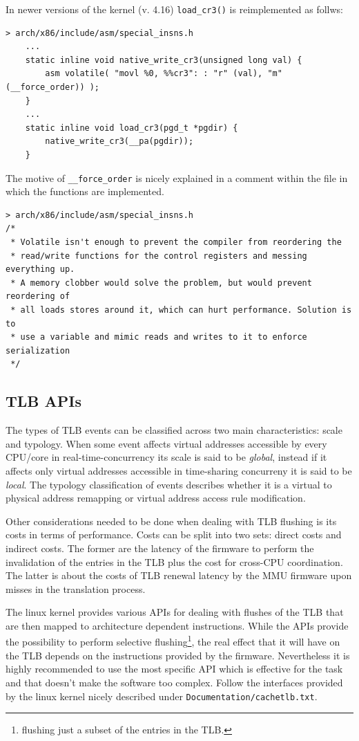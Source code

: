 \documentclass[twoside]{article}
\begin{document}
In newer versions of the kernel (v. 4.16) \texttt{load_cr3()} is
reimplemented as follws:

\begin{verbatim}
> arch/x86/include/asm/special_insns.h 
    ...
    static inline void native_write_cr3(unsigned long val) {
        asm volatile( "movl %0, %%cr3": : "r" (val), "m" (__force_order)) );
    }
    ...
    static inline void load_cr3(pgd_t *pgdir) {
        native_write_cr3(__pa(pgdir));
    }   
\end{verbatim}

The motive of \texttt{__force_order} is nicely explained in a comment within
the file in which the functions are implemented.

\begin{verbatim}
> arch/x86/include/asm/special_insns.h 
/*
 * Volatile isn't enough to prevent the compiler from reordering the
 * read/write functions for the control registers and messing everything up.
 * A memory clobber would solve the problem, but would prevent reordering of
 * all loads stores around it, which can hurt performance. Solution is to
 * use a variable and mimic reads and writes to it to enforce serialization
 */
\end{verbatim}

\subsection{TLB APIs}
\label{subsec:TLB APIs}

The types of TLB events can be classified across two main characteristics:
scale and typology. When some event affects virtual addresses accessible
by every CPU/core in real-time-concurrency its scale is said to be
\textit{global}, instead if it affects only virtual addresses accessible
in time-sharing concurreny it is said to be \textit{local}.
The typology classification of events describes whether it is a virtual
to physical address remapping or virtual address access rule modification.

Other considerations needed to be done when dealing with TLB flushing is
its costs in terms of performance. Costs can be split into two sets: direct
costs and indirect costs. The former are the latency of the firmware to
perform the invalidation of the entries in the TLB plus the cost for
cross-CPU coordination. The latter is about the costs of TLB renewal
latency by the MMU firmware upon misses in the translation process.

The linux kernel provides various APIs for dealing with flushes of the
TLB that are then mapped to architecture dependent instructions. While
the APIs provide the possibility to perform selective flushing\footnote{
flushing just a subset of the entries in the TLB.}, the real effect
that it will have on the TLB depends on the instructions provided by the
firmware. Nevertheless it is highly recommended to use the most specific
API which is effective for the task and that doesn't make the software
too complex. Follow the interfaces provided by the linux kernel nicely
described under \texttt{Documentation/cachetlb.txt}.
\end{document}
